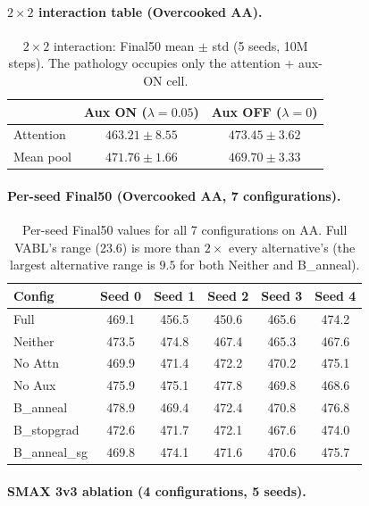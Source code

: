 \documentclass{article}
\theoremstyle{plain}
\theoremstyle{definition}
\theoremstyle{remark}
\begin{document}
\paragraph{$2 \times 2$ interaction table (Overcooked AA).}

\begin{table}[H]
\centering
\small
\begin{tabular}{lcc}
\toprule
 & Aux ON ($\lambda{=}0.05$) & Aux OFF ($\lambda{=}0$) \\
\midrule
Attention & $463.21 \pm 8.55$ & $473.45 \pm 3.62$ \\
Mean pool & $471.76 \pm 1.66$ & $469.70 \pm 3.33$ \\
\bottomrule
\end{tabular}
\caption{$2 \times 2$ interaction: Final50 mean $\pm$ std (5 seeds, 10M steps).
The pathology occupies only the attention + aux-ON cell.}
\end{table}

\paragraph{Per-seed Final50 (Overcooked AA, 7 configurations).}

\begin{table}[H]
\centering
\small
\begin{tabular}{lccccc}
\toprule
Config & Seed 0 & Seed 1 & Seed 2 & Seed 3 & Seed 4 \\
\midrule
Full & 469.1 & 456.5 & 450.6 & 465.6 & 474.2 \\
Neither & 473.5 & 474.8 & 467.4 & 465.3 & 467.6 \\
No Attn & 469.9 & 471.4 & 472.2 & 470.2 & 475.1 \\
No Aux & 475.9 & 475.1 & 477.8 & 469.8 & 468.6 \\
\midrule
B\_anneal & 478.9 & 469.4 & 472.4 & 470.8 & 476.8 \\
B\_stopgrad & 472.6 & 471.7 & 472.1 & 467.6 & 474.0 \\
B\_anneal\_sg & 469.8 & 474.1 & 471.6 & 470.6 & 475.7 \\
\bottomrule
\end{tabular}
\caption{Per-seed Final50 values for all 7 configurations on AA. Full VABL's
range (23.6) is more than $2\times$ every alternative's (the largest
alternative range is $9.5$ for both Neither and B\_anneal).}
\end{table}

\paragraph{SMAX 3v3 ablation (4 configurations, 5 seeds).}
\end{document}

